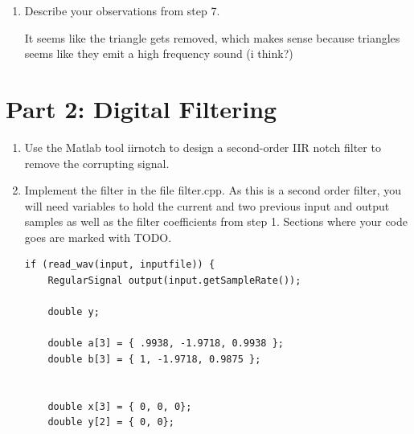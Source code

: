 \documentclass{article}
\begin{document}
\begin{enumerate}
\begin{enumerate}
\begin{center}
        \end{center}
        \item Describe your observations from step 7.
        \begin{center}
            It seems like the triangle gets removed, which makes sense because triangles seems like they emit a high frequency sound (i think?)
        \end{center}
    \end{enumerate}
\end{enumerate}
\newpage
\section*{Part 2: Digital Filtering}
\begin{enumerate}
    \item Use the Matlab tool iirnotch to design a second-order IIR notch filter to remove the corrupting signal.
    
    \begin{center}
    \end{center}
    \item Implement the filter in the file filter.cpp. As this is a second order filter, you will need variables to hold the current and two previous input and output samples as well as the filter coefficients from step 1. Sections where your code goes are marked with TODO.
    
    \begin{verbatim} 
if (read_wav(input, inputfile)) {
    RegularSignal output(input.getSampleRate());

    double y;

    double a[3] = { .9938, -1.9718, 0.9938 };
    double b[3] = { 1, -1.9718, 0.9875 };
    

    double x[3] = { 0, 0, 0};
    double y[2] = { 0, 0};


\end{verbatim}
\end{enumerate}
\end{document}
